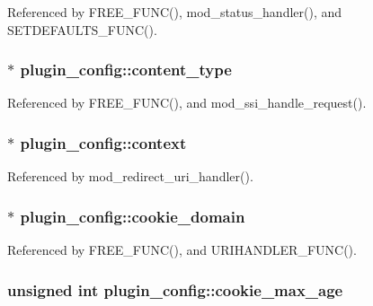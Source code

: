 Referenced by F\-R\-E\-E\-\_\-\-F\-U\-N\-C(), mod\-\_\-status\-\_\-handler(), and S\-E\-T\-D\-E\-F\-A\-U\-L\-T\-S\-\_\-\-F\-U\-N\-C().

\hypertarget{structplugin__config_a8c7734d100c6746915cdce4b36696f9d}{
\subsubsection[{content\-\_\-type}]{$\ast$ plugin\-\_\-config\-::content\-\_\-type}}\label{structplugin__config_a8c7734d100c6746915cdce4b36696f9d}


Referenced by F\-R\-E\-E\-\_\-\-F\-U\-N\-C(), and mod\-\_\-ssi\-\_\-handle\-\_\-request().

\hypertarget{structplugin__config_a70a986ce1aff88b9c7fa6acdb7134fea}{
\subsubsection[{context}]{$\ast$ plugin\-\_\-config\-::context}}\label{structplugin__config_a70a986ce1aff88b9c7fa6acdb7134fea}


Referenced by mod\-\_\-redirect\-\_\-uri\-\_\-handler().

\hypertarget{structplugin__config_a393dbba4fefb1846530631039ac161da}{
\subsubsection[{cookie\-\_\-domain}]{$\ast$ plugin\-\_\-config\-::cookie\-\_\-domain}}\label{structplugin__config_a393dbba4fefb1846530631039ac161da}


Referenced by F\-R\-E\-E\-\_\-\-F\-U\-N\-C(), and U\-R\-I\-H\-A\-N\-D\-L\-E\-R\-\_\-\-F\-U\-N\-C().

\hypertarget{structplugin__config_a5e03796e2f0cdb659c7f0def210b7eea}{
\subsubsection[{cookie\-\_\-max\-\_\-age}]{\setlength{\rightskip}{0pt plus 5cm}unsigned int plugin\-\_\-config\-::cookie\-\_\-max\-\_\-age}}\label{structplugin__config_a5e03796e2f0cdb659c7f0def210b7eea}



